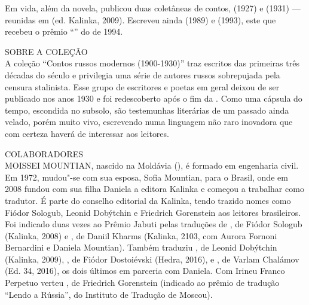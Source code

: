 Em vida, além da novela, publicou duas coletâneas de contos,
{} (1927) e {} (1931) — reunidas em
{} (ed. Kalinka, 2009). Escreveu ainda
{} (1989) e {} (1993), este que
recebeu o prêmio “{}” do {} de 1994.

\bigskip

\noindent{}SOBRE A COLEÇÃO\\

A coleção “Contos russos modernos (1900-1930)” traz escritos das
primeiras três décadas do século  e privilegia uma série de autores
russos sobrepujada pela censura stalinista. Esse grupo de escritores e
poetas em geral deixou de ser publicado nos anos 1930 e foi redescoberto
após o fim da . Como uma cápsula do tempo, escondida no subsolo, são
testemunhas literárias de um passado ainda velado, porém muito vivo,
escrevendo numa linguagem não raro inovadora que com certeza haverá de
interessar aos leitores.

\pagebreak

\noindent{}COLABORADORES\\

\noindent{}MOISSEI MOUNTIAN, nascido na Moldávia (), é formado em engenharia civil. Em 1972, mudou"-se com sua esposa, Sofia Mountian, para o Brasil,
onde em 2008 fundou com sua filha Daniela a editora Kalinka e começou a
trabalhar como tradutor. É parte do conselho editorial da Kalinka, tendo
trazido nomes como Fiódor Sologub, Leonid Dobýtchin e Friedrich
Gorenstein aos leitores brasileiros. Foi indicado duas vezes ao Prêmio
Jabuti pelas traduções de {}, de Fiódor Sologub
(Kalinka, 2008) e {}, de Daniil Kharms (Kalinka, 2103, com Aurora Fornoni
Bernardini e Daniela Mountian). Também traduziu {}, de Leonid Dobýtchin (Kalinka, 2009), {}, de Fiódor Dostoiévski
(Hedra, 2016), e {}, de
Varlam Chalámov (Ed. 34, 2016), os dois últimos em parceria com Daniela.
Com Irineu Franco Perpetuo verteu {}, de Friedrich Gorenstein
(indicado ao prêmio de tradução “Lendo a Rússia”, do Instituto de
Tradução de Moscou).

%


